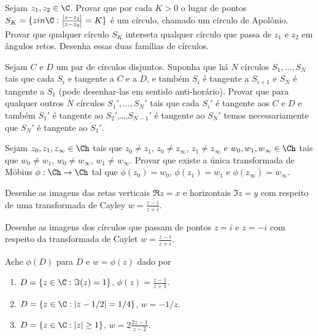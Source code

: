 \begin{problema}
Sejam $z_1,z_2\in\C$. Provar que por cada $K>0$ o lugar de pontos
$S_K = \{z in \C: \frac{|z-z_1|}{|z-z_2|} = K \}$ é um círculo, chamado um círculo de Apolônio.
Provar que qualquer círculo $S_K$ interseta qualquer círculo que passa de $z_1$ e $z_2$ em ângulos retos.
Desenha essas duas famílias de círculos.
\end{problema}

\begin{problema}
Sejam $C$ e $D$ um par de círculos disjuntos. Suponha que há $N$ círculos
$S_1,\dots,S_N$ tais que cada $S_i$ e tangente a $C$ e a $D$,
e também $S_i$ é tangente a $S_{i+1}$ e $S_N$ é tangente a $S_1$ (pode desenhar-las em sentido anti-horário).
Provar que para qualquer outros $N$ círculos $S_1',\dots,S_N'$ tais que
cada $S_i'$ é tangente aos $C$ e $D$ e também $S_1'$ é tangente ao $S_2'$,\dots,$S_{N-1}'$ é tangente ao $S_N'$
temos necessariamente que $S_N'$ é tangente ao $S_1'$.
\end{problema}

\begin{problema}
Sejam 
$z_0,z_1,z_\infty \in\Ch$ tais que $z_0\neq z_1$, $z_0\neq z_\infty$, $z_1\neq z_\infty$
e 
$w_0,w_1,w_\infty \in\Ch$ tais que $w_0\neq w_1$, $w_0\neq w_\infty$, $w_1\neq w_\infty$.
Provar que existe a única transformada de Möbius $\phi : \Ch \to \Ch$ tal que
$\phi(z_0) = w_0$, $\phi(z_1) = w_1$ e $\phi(z_\infty) = w_\infty$.
\end{problema}

\begin{problema}
Desenhe as imagens das retas verticais $\Re z = x$ e horizontais $\Im z = y$
com respeito de uma transformada de Cayley $w = \frac{z-i}{z+i}$.
\end{problema}

\begin{problema}
Desenhe as imagens dos círculos que passam de pontos $z=i$ e $z=-i$ com respeito da transformada
de Caylet $w = \frac{z-i}{z+i}$.
\end{problema}

\begin{problema}
Ache $\phi(D)$ para $D$ e $w=\phi(z)$ dado por
\begin{enumerate}
\item $D = \{z\in\C: \Im(z) = 1\}$, $\phi(z) = \frac{z-1}{z+1}$.
\item $D = \{z\in\C: |z-1/2| = 1/4\}$, $w = -1/z$.
\item $D = \{z\in\C: |z|\geq 1 \}$, $w = 2 \frac{2z-1}{z-2}$.
\end{enumerate}
\end{problema}
